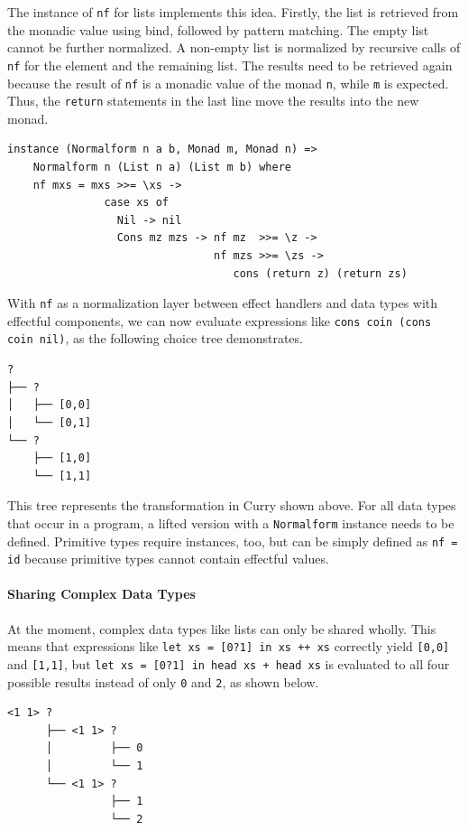 \documentclass[a4paper, 11pt, fleqn, twoside]{scrreprt}
\newcommand{\hinl}[1]{\texttt{#1}}
\begin{document}
The instance of \hinl{nf} for lists implements this idea.
Firstly, the list is retrieved from the monadic value using bind, followed by pattern matching.
The empty list cannot be further normalized.
A non-empty list is normalized by recursive calls of \hinl{nf} for the element and the remaining list.
The results need to be retrieved again because the result of \hinl{nf} is a monadic value of the monad \hinl{n}, while \hinl{m} is expected.
Thus, the \hinl{return} statements in the last line move the results into the new monad.
\begin{verbatim}
instance (Normalform n a b, Monad m, Monad n) =>
    Normalform n (List n a) (List m b) where
    nf mxs = mxs >>= \xs ->
               case xs of
                 Nil -> nil
                 Cons mz mzs -> nf mz  >>= \z ->
                                nf mzs >>= \zs ->
                                   cons (return z) (return zs)
\end{verbatim}

With \hinl{nf} as a normalization layer between effect handlers and data types with effectful components, we can now evaluate expressions like \hinl{cons coin (cons coin nil)}, as the following choice tree demonstrates.

\begin{verbatim}
? 
├── ? 
│   ├── [0,0]
│   └── [0,1]
└── ? 
    ├── [1,0]
    └── [1,1]
\end{verbatim}

This tree represents the transformation in Curry shown above.
For all data types that occur in a program, a lifted version with a \hinl{Normalform} instance needs to be defined.
Primitive types require instances, too, but can be simply defined as \hinl{nf = id} because primitive types cannot contain effectful values.

\paragraph{Sharing Complex Data Types}
At the moment, complex data types like lists can only be shared wholly.
This means that expressions like \hinl{let xs = [0?1] in xs ++ xs} correctly yield \hinl{[0,0]} and \hinl{[1,1]}, but \hinl{let xs = [0?1] in head xs + head xs} is evaluated to all four possible results instead of only \hinl{0} and \hinl{2}, as shown below.

\begin{verbatim}
<1 1> ? 
      ├── <1 1> ? 
      │         ├── 0
      │         └── 1
      └── <1 1> ? 
                ├── 1
                └── 2
\end{verbatim}
\end{document}
